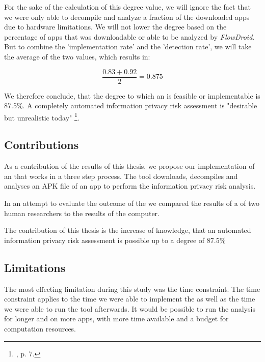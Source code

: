For the sake of the calculation of this degree value, we will ignore the fact that we were only able to decompile and analyze a fraction of the downloaded apps due to hardware limitations.
We will not lower the degree based on the percentage of apps that was downloadable or able to be analyzed by \textit{FlowDroid}.
But to combine the 'implementation rate' and the 'detection rate', we will take the average of the two values, which results in:

\begin{equation}
	\frac{0.83 + 0.92}{2} = 0.875
\end{equation}

We therefore conclude, that the degree to which an \aiprat is feasible or implementable is 87.5\%.
A completely automated information privacy risk assessment is "desirable but unrealistic today" \footnote{\cite{Knorr2015}, p. 7.}.

\subsection{Contributions}

As a contribution of the results of this thesis, we propose our implementation of an \aiprat that works in a three step process.
The tool downloads, decompiles and analyses an APK file of an app to perform the information privacy risk analysis.

In an attempt to evaluate the outcome of the \aiprat we compared the results of a \sca of two human researchers to the results of the computer.

The contribution of this thesis is the increase of knowledge, that an automated information privacy risk assessment is possible up to a degree of 87.5\%

\subsection{Limitations}\label{chapter:Limitations}

The most effecting limitation during this study was the time constraint.
The time constraint applies to the time we were able to implement the \aiprat as well as the time we were able to run the tool afterwards.
It would be possible to run the analysis for longer and on more apps, with more time available and a budget for computation resources.


